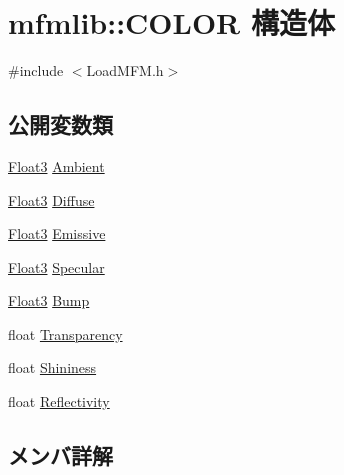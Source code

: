 \hypertarget{structmfmlib_1_1_c_o_l_o_r}{}\section{mfmlib\+:\+:C\+O\+L\+OR 構造体}
\label{structmfmlib_1_1_c_o_l_o_r}


{\ttfamily \#include $<$Load\+M\+F\+M.\+h$>$}

\subsection*{公開変数類}
\begin{DoxyCompactItemize}
\item 
\mbox{\hyperlink{structmfmlib_1_1_float3}{Float3}} \mbox{\hyperlink{structmfmlib_1_1_c_o_l_o_r_a66a6ab53ba9f59038bb853b5cb2bcee3}{Ambient}}
\item 
\mbox{\hyperlink{structmfmlib_1_1_float3}{Float3}} \mbox{\hyperlink{structmfmlib_1_1_c_o_l_o_r_a1c67c1a239b12b2896e07a19643ecf95}{Diffuse}}
\item 
\mbox{\hyperlink{structmfmlib_1_1_float3}{Float3}} \mbox{\hyperlink{structmfmlib_1_1_c_o_l_o_r_a179a172e0911c311ce7f5292f428897a}{Emissive}}
\item 
\mbox{\hyperlink{structmfmlib_1_1_float3}{Float3}} \mbox{\hyperlink{structmfmlib_1_1_c_o_l_o_r_a6f8590c510c471fb9bfe748c113d86d0}{Specular}}
\item 
\mbox{\hyperlink{structmfmlib_1_1_float3}{Float3}} \mbox{\hyperlink{structmfmlib_1_1_c_o_l_o_r_ac6c7c91adc2d4fafe3ac020ff75c871f}{Bump}}
\item 
float \mbox{\hyperlink{structmfmlib_1_1_c_o_l_o_r_a5b50ad6ab93f151be8466ce16ac59e97}{Transparency}}
\item 
float \mbox{\hyperlink{structmfmlib_1_1_c_o_l_o_r_ae5cd2d46dcc9798ded9ecc7f3617bc40}{Shininess}}
\item 
float \mbox{\hyperlink{structmfmlib_1_1_c_o_l_o_r_a3df7017bc9d137c037452cc338fb2b66}{Reflectivity}}
\end{DoxyCompactItemize}


\subsection{メンバ詳解}
\mbox{\label{structmfmlib_1_1_c_o_l_o_r_a66a6ab53ba9f59038bb853b5cb2bcee3}} 
